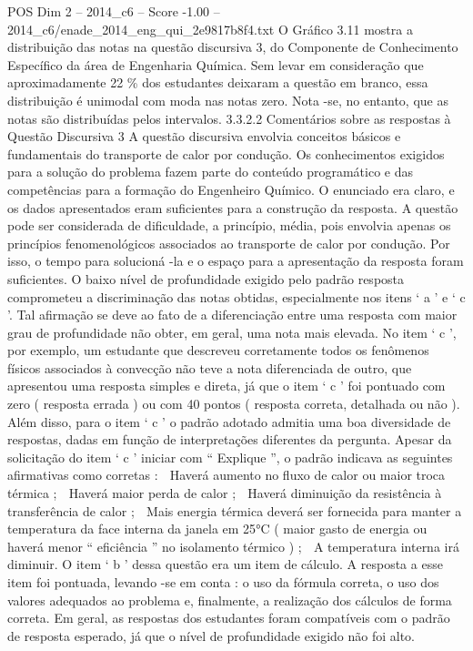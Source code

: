 \begin{textsample}{POS Dim 2 – 2014\_c6 – Score -1.00 – 2014\_c6/enade\_2014\_eng\_qui\_2e9817b8f4.txt}
O Gráfico 3.11 mostra a distribuição das notas na questão discursiva 3, do Componente de Conhecimento Específico da área de Engenharia Química.
Sem levar em consideração que aproximadamente 22 \% dos estudantes deixaram a questão em branco, essa distribuição é unimodal com moda nas notas zero.
Nota -se, no entanto, que as notas são distribuídas pelos intervalos. 3.3.2.2 Comentários sobre as respostas à Questão Discursiva 3 A questão discursiva envolvia conceitos básicos e fundamentais do transporte de calor por condução.
Os conhecimentos exigidos para a solução do problema fazem parte do conteúdo programático e das competências para a formação do Engenheiro Químico.
O enunciado era claro, e os dados apresentados eram suficientes para a construção da resposta.
A questão pode ser considerada de dificuldade, a princípio, média, pois envolvia apenas os princípios fenomenológicos associados ao transporte de calor por condução.
Por isso, o tempo para solucioná -la e o espaço para a apresentação da resposta foram suficientes.
O baixo nível de profundidade exigido pelo padrão resposta comprometeu a discriminação das notas obtidas, especialmente nos itens ‘ a ’ e ‘ c ’.
Tal afirmação se deve ao fato de a diferenciação entre uma resposta com maior grau de profundidade não obter, em geral, uma nota mais elevada.
No item ‘ c ’, por exemplo, um estudante que descreveu corretamente todos os fenômenos físicos associados à convecção não teve a nota diferenciada de outro, que apresentou uma resposta simples e direta, já que o item ‘ c ’ foi pontuado com zero ( resposta errada ) ou com 40 pontos ( resposta correta, detalhada ou não ).
Além disso, para o item ‘ c ’ o padrão adotado admitia uma boa diversidade de respostas, dadas em função de interpretações diferentes da pergunta.
Apesar da solicitação do item ‘ c ’ iniciar com “ Explique ”, o padrão indicava as seguintes afirmativas como corretas :  Haverá aumento no fluxo de calor ou maior troca térmica ;  Haverá maior perda de calor ;  Haverá diminuição da resistência à transferência de calor ;  Mais energia térmica deverá ser fornecida para manter a temperatura da face interna da janela em 25{\EmojiFont °}C ( maior gasto de energia ou haverá menor “ eficiência ” no isolamento térmico ) ;  A temperatura interna irá diminuir.
O item ‘ b ’ dessa questão era um item de cálculo.
A resposta a esse item foi pontuada, levando -se em conta : o uso da fórmula correta, o uso dos valores adequados ao problema e, finalmente, a realização dos cálculos de forma correta.
Em geral, as respostas dos estudantes foram compatíveis com o padrão de resposta esperado, já que o nível de profundidade exigido não foi alto.

\end{textsample}
